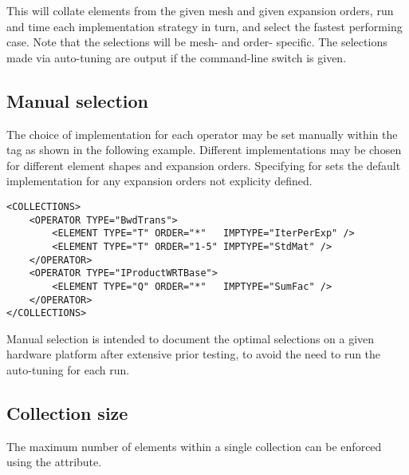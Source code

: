 This will collate elements from the given mesh and given expansion orders,
run and time each implementation strategy in turn, and select the fastest
performing case. Note that the selections will be mesh- and order- specific.
The selections made via auto-tuning are output if the 
command-line switch is given.

\subsection{Manual selection}
The choice of implementation for each operator may be set manually within the
 tag as shown in the following example. Different implementations may be chosen for different element shapes and expansion orders.
Specifying \inltt{*} for  sets the default implementation for any
expansion orders not explicity defined.
\begin{lstlisting}[style=XmlStyle]
<COLLECTIONS>
    <OPERATOR TYPE="BwdTrans">
        <ELEMENT TYPE="T" ORDER="*"   IMPTYPE="IterPerExp" />
        <ELEMENT TYPE="T" ORDER="1-5" IMPTYPE="StdMat" />
    </OPERATOR>
    <OPERATOR TYPE="IProductWRTBase">
        <ELEMENT TYPE="Q" ORDER="*"   IMPTYPE="SumFac" />
    </OPERATOR>
</COLLECTIONS>
\end{lstlisting}

Manual selection is intended to document the optimal selections on a given
hardware platform after extensive prior testing, to avoid the need to run the
auto-tuning for each run.

\subsection{Collection size}
The maximum number of elements within a single collection can be enforced using
the  attribute.


